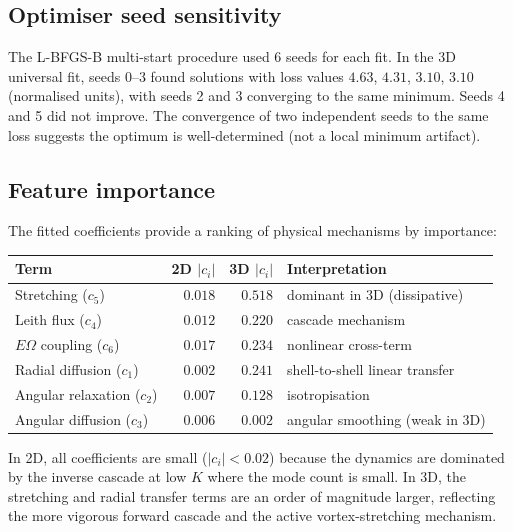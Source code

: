 \documentclass[11pt,a4paper]{article}
\theoremstyle{remark}
\begin{document}
\subsection{Optimiser seed sensitivity}

The L-BFGS-B multi-start procedure used 6 seeds for each fit.  In the 3D universal fit, seeds 0--3 found solutions with loss values $4.63$, $4.31$, $3.10$, $3.10$ (normalised units), with seeds 2 and 3 converging to the same minimum.  Seeds 4 and 5 did not improve.  The convergence of two independent seeds to the same loss suggests the optimum is well-determined (not a local minimum artifact).

\subsection{Feature importance}

The fitted coefficients provide a ranking of physical mechanisms by importance:
\begin{center}
\begin{tabular}{lrrl}
\toprule
Term & 2D $|c_i|$ & 3D $|c_i|$ & Interpretation \\
\midrule
Stretching ($c_5$) & $0.018$ & $0.518$ & dominant in 3D (dissipative) \\
Leith flux ($c_4$) & $0.012$ & $0.220$ & cascade mechanism \\
$E\Omega$ coupling ($c_6$) & $0.017$ & $0.234$ & nonlinear cross-term \\
Radial diffusion ($c_1$) & $0.002$ & $0.241$ & shell-to-shell linear transfer \\
Angular relaxation ($c_2$) & $0.007$ & $0.128$ & isotropisation \\
Angular diffusion ($c_3$) & $0.006$ & $0.002$ & angular smoothing (weak in 3D) \\
\bottomrule
\end{tabular}
\end{center}

In 2D, all coefficients are small ($|c_i| < 0.02$) because the dynamics are dominated by the inverse cascade at low $K$ where the mode count is small.  In 3D, the stretching and radial transfer terms are an order of magnitude larger, reflecting the more vigorous forward cascade and the active vortex-stretching mechanism.

\bigskip
\end{document}
